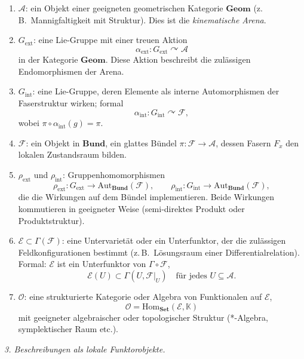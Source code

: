 \documentclass[10pt, letterpaper]{article}
\newcommand{\Aut}{\mathrm{Aut}}
\begin{document}
\begin{enumerate}
\item $\mathcal{A}$: ein Objekt einer geeigneten geometrischen Kategorie $\mathbf{Geom}$ (z.\,B.\ Mannigfaltigkeit mit Struktur).  
Dies ist die \emph{kinematische Arena}.

\item $G_{\mathrm{ext}}$: eine Lie-Gruppe mit einer treuen Aktion
\[
\alpha_{\mathrm{ext}}: G_{\mathrm{ext}} \curvearrowright \mathcal{A}
\]
in der Kategorie $\mathbf{Geom}$.  
Diese Aktion beschreibt die zulässigen Endomorphismen der Arena.

\item $G_{\mathrm{int}}$: eine Lie-Gruppe, deren Elemente als interne Automorphismen der Faserstruktur wirken; formal
\[
\alpha_{\mathrm{int}}: G_{\mathrm{int}} \curvearrowright \mathcal{F},
\]
wobei $\pi\circ \alpha_{\mathrm{int}}(g)=\pi$.

\item $\mathcal{F}$: ein Objekt in $\mathbf{Bund}$, ein glattes Bündel $\pi:\mathcal{F}\to\mathcal{A}$,
dessen Fasern $F_x$ den lokalen Zustandsraum bilden.

\item $\rho_{\mathrm{ext}}$ und $\rho_{\mathrm{int}}$: Gruppenhomomorphismen
\[
\rho_{\mathrm{ext}}: G_{\mathrm{ext}} \longrightarrow \Aut_{\mathbf{Bund}}(\mathcal{F}),
\qquad
\rho_{\mathrm{int}}: G_{\mathrm{int}} \longrightarrow \Aut_{\mathbf{Bund}}(\mathcal{F}),
\]
die die Wirkungen auf dem Bündel implementieren.  
Beide Wirkungen kommutieren in geeigneter Weise (semi-direktes Produkt oder Produktstruktur).

\item $\mathcal{E}\subset \Gamma(\mathcal{F})$: eine Untervarietät oder ein Unterfunktor, der die
zulässigen Feldkonfigurationen bestimmt (z.\,B.\ Lösungsraum einer Differentialrelation).  
Formal: $\mathcal{E}$ ist ein Unterfunktor von $\Gamma\circ\mathcal{F}$,
\[
\mathcal{E}(U) \subset \Gamma(U,\mathcal{F}|_U)
\quad\text{für jedes }U\subseteq\mathcal{A}.
\]

\item $\mathcal{O}$: eine strukturierte Kategorie oder Algebra von Funktionalen auf $\mathcal{E}$,
\[
\mathcal{O} = \mathrm{Hom}_{\mathbf{Set}}(\mathcal{E}, \mathbb{K})
\]
mit geeigneter algebraischer oder topologischer Struktur (*-Algebra, symplektischer Raum etc.).
\end{enumerate}

\bigskip
\emph{3. Beschreibungen als lokale Funktorobjekte.}
\end{document}
